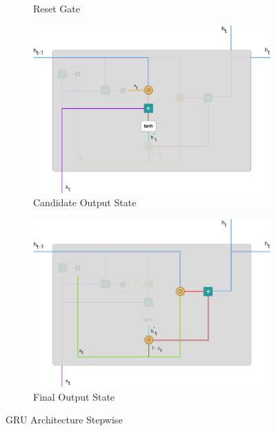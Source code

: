 \documentclass[twoside,11pt,a4paper]{article}
\begin{document}
\begin{figure}[h!]
\begin{subfigure}{0.49 \textwidth}
		\caption[Reset Gate]{Reset Gate}
		\label{fig:gru_rgate}
	\end{subfigure}
	\begin{subfigure}{0.49 \textwidth}
		\includegraphics[width=1\linewidth, height=1\linewidth]{gru_cstate}
		\caption[Candidate Output State]{Candidate Output State}
		\label{fig:gru_cstate}
	\end{subfigure}
	\hfill
	\begin{subfigure}{0.49 \textwidth}
		\includegraphics[width=1\linewidth, height=1\linewidth]{gru_nstate}
		\caption[Final Output State]{Final Output State}
		\label{fig:gru_nstate}
	\end{subfigure}
	\caption[\acs{GRU} Architecture Stepwise]{\acs{GRU} Architecture Stepwise \citep{simeon2017gru}}
	\label{fig:gru_detail}
\end{figure}
\end{document}
